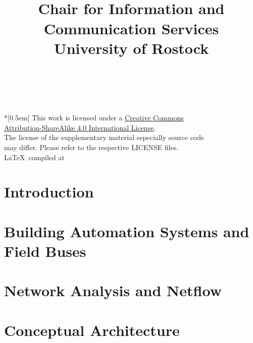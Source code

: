 \documentclass[12pt, a4paper, titlepage, oneside]{book}
\title{\thetitle\\[24pt]
	\small Chair for Information and Communication Services\\[-3pt]
	\small University of Rostock}
\author{\theauthor}
\date{\thedate}
\begin{document}
	
	~ \vfill
	\begin{flushright}
		\tiny \noindent
		{\normalsize \href{http://creativecommons.org/licenses/by-sa/4.0/}{\ccbysa}} \\*[0.5em]
		This work is licensed under a \href{http://creativecommons.org/licenses/by-sa/4.0/}{Creative Commons\\%
		Attribution-ShareAlike 4.0 International License}. \\
		The license of the supplementary material especially source code\\%
		may differ. Please refer to the respective LICENSE files.\\
		\LaTeX ~compiled at \DTMnow
	\end{flushright}
	\pagebreak
	\clearpage
	\setcounter{page}{1}
	\tableofcontents
	\listoffigures
	\listoftables
	
	\newpage
	
	\chapter{Introduction}
	\label{sec:intro}
	
	
	\chapter{Building Automation Systems and Field Buses}
	\label{sec:background:bas}
	
	
	\chapter{Network Analysis and Netflow}
	\label{sec:background:network}
	
	
	\chapter{Conceptual Architecture}
	\label{sec:concept}
	
	
\end{document}
